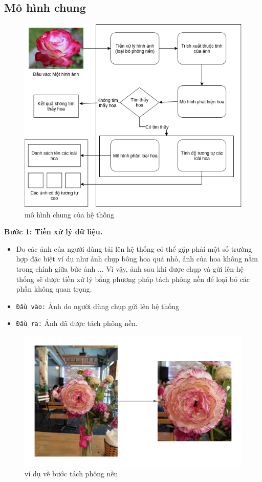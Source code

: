 \documentclass[12pt]{report}
\begin{document}
		\subsection{Mô hình chung}
		\begin{figure}[h]
			\centering
			\includegraphics[scale=0.81]{mohinhchung}
			\caption{mô hình chung của hệ thống}
			\label{fig:mohinhchung}
		\end{figure}
														
		\textbf{Bước 1: Tiền xử lý dữ liệu.} 
		\begin{itemize}
			\item Do các ảnh của người dùng tải lên hệ thống có thể gặp phải một số trường hợp đặc biệt ví dụ như ảnh chụp bông hoa quá nhỏ, ảnh của hoa không nằm trong chính giữa bức ảnh ... Vì vậy, ảnh sau khi được chụp và gửi lên hệ thống sẽ được tiền xử lý bằng phương pháp tách phông nền để loại bỏ các phần không quan trọng.
			\item \texttt{Đầu vào:} Ảnh do người dùng chụp gửi lên hệ thống
			\item \texttt{Đầu ra:} Ảnh đã được tách phông nền.
		\end{itemize}
														
		\begin{figure}[h]
			\centering
			\includegraphics[scale=0.4]{tach_phong_nen}
			\caption{ví dụ về bước tách phông nền}
			\label{fig:tach_phong_nen}
		\end{figure}
														
\end{document}
